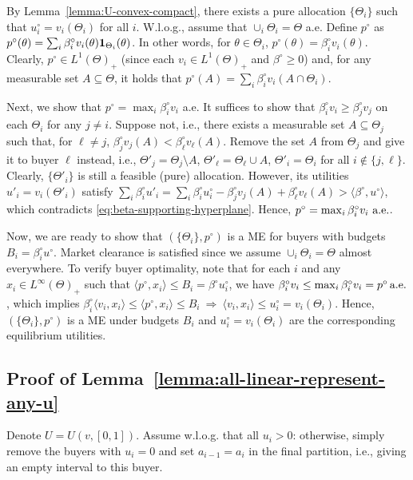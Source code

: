 	By Lemma~\ref{lemma:U-convex-compact}, there exists a pure allocation $\{\Theta_i\}$ such that $u^\circ_i = v_i(\Theta_i)$ for all $i$. W.l.o.g., assume that $\cup_i \Theta_i = \Theta$ a.e.
	Define $p^\circ$ as 
	$ p^\circ(\theta) = \sum_i \beta^\circ_i v_i(\theta)\mathbf{1}_{\Theta_i}(\theta)$. 
	In other words, for $\theta\in \Theta_i$, $p^\circ(\theta) = \beta^\circ_i v_i(\theta)$. Clearly, $p^\circ\in L^1(\Theta)_+$ (since each $v_i\in L^1(\Theta)_+$ and $\beta^\circ \geq 0$) and, for any measurable set $A\subseteq \Theta$, it holds that
	$ p^\circ(A) = \sum_i \beta^\circ_i v_i(A\cap \Theta_i)$.
	
	Next, we show that $p^\circ = \max_i \beta^\circ_i v_i$ a.e. It suffices to show that $\beta^\circ_i v_i \geq \beta^\circ_j v_j$ on each $\Theta_i$ for any $j\neq i$. Suppose not, i.e., there exists a measurable set $A\subseteq \Theta_j$ such that, for $\ell \neq j$,
	$ \beta^\circ_j v_j(A) < \beta^\circ_\ell v_\ell(A)$.
	Remove the set $A$ from $\Theta_j$ and give it to buyer $\ell$ instead, i.e., $\Theta'_j = \Theta_j \setminus A$, $\Theta'_\ell = \Theta_\ell \cup A$, $\Theta'_i = \Theta_i$ for all $i \notin \{j, \ell\}$. 
	Clearly, $\{\Theta'_i\}$ is still a feasible (pure) allocation. However, its utilities $u'_i = v_i(\Theta'_i)$ satisfy
	$ \sum_i \beta^\circ_i u'_i = \sum_i \beta^\circ_i u^\circ_i - \beta^\circ_j v_j(A) + \beta^\circ_\ell v_\ell(A) > \langle \beta^\circ, u^\circ\rangle$,
	which contradicts \eqref{eq:beta-supporting-hyperplane}. 
	Hence,
	$ p^\circ = \max_i \beta^\circ_i v_i \ \almeve$.
	
	Now, we are ready to show that $(\{\Theta_i\}, p^\circ)$ is a ME for buyers with budgets $B_i = \beta^\circ_i u^\circ$. Market clearance is satisfied since we assume $\cup_i \Theta_i = \Theta$ almost everywhere. 
	To verify buyer optimality, note that for each $i$ and any $x_i \in L^\infty(\Theta)_+$ such that $\langle p^\circ, x_i \rangle \leq B_i = \beta^\circ u^\circ_i$, we have 
	$ \beta^\circ_i v_i \leq \max_i \beta^\circ_i v_i = p^\circ \, \textnormal{a.e.}$,
	which implies
	$\beta^\circ_i \langle v_i, x_i \rangle \leq \langle p^\circ, x_i \rangle \leq B_i \ \Rightarrow \ \langle v_i, x_i \rangle \leq u^\circ_i = v_i(\Theta_i)$.
	Hence, $(\{\Theta_i\}, p^\circ)$ is a ME under budgets $B_i$ and $u^\circ_i = v_i(\Theta_i)$ are the corresponding equilibrium utilities.

	\subsection*{Proof of Lemma~\ref{lemma:all-linear-represent-any-u}}
	Denote $U = U(v, [0,1])$. 
	Assume w.l.o.g. that all $u_i > 0$: otherwise, simply remove the buyers with $u_i = 0$ and set $a_{i-1} = a_i$ in the final partition, i.e., giving an empty interval to this buyer.

